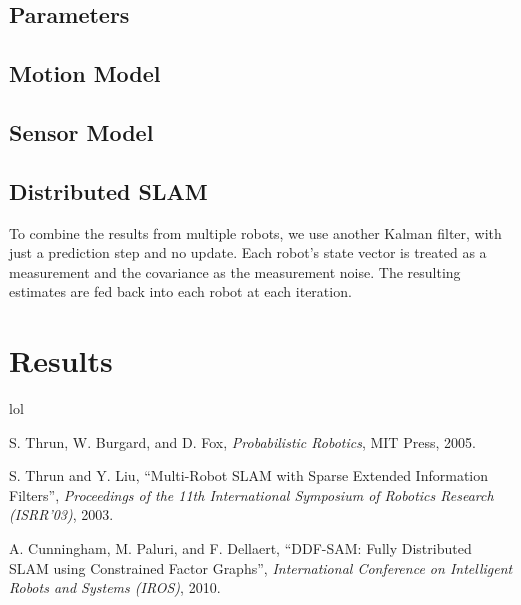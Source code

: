 \documentclass[prodmode,acmtecs]{acmsmall} %
\begin{document}
\subsection{Parameters}

\subsection{Motion Model}

\subsection{Sensor Model}

\subsection{Distributed SLAM}

To combine the results from multiple robots, we use another Kalman filter, with just a prediction step and no update.  Each robot's state vector is treated as a measurement and the covariance as the measurement noise.  The resulting estimates are fed back into each robot at each iteration.



\section{Results}

lol



\begin{thebibliography}{12}
        S. Thrun, W. Burgard, and D. Fox, \emph{Probabilistic Robotics}, MIT Press, 2005.

        S. Thrun and Y. Liu, ``Multi-Robot SLAM with Sparse Extended Information Filters'', \emph{Proceedings of the 11th International Symposium of Robotics Research (ISRR'03)}, 2003.

        A. Cunningham, M. Paluri, and F. Dellaert, ``DDF-SAM: Fully Distributed SLAM using Constrained Factor Graphs'', \emph{International Conference on Intelligent Robots and Systems (IROS)}, 2010.

\end{thebibliography}
\end{document}
